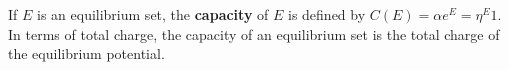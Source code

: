 If $E$ is an equilibrium set, the \textbf{capacity} of $E$ is defined by $C(E) = \alpha e^E = \eta^E 1$. In terms of total charge, the capacity of an equilibrium set is the total charge of the equilibrium potential.